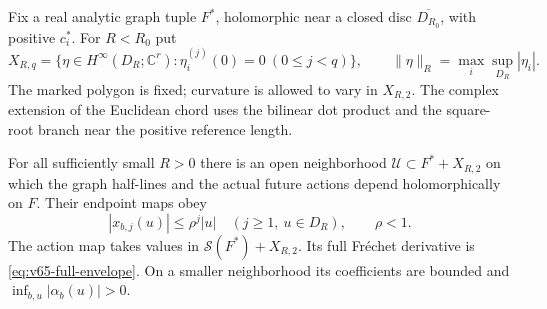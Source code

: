 Fix a real analytic graph tuple $F^*$, holomorphic near a closed disc
$\overline{D_{R_0}}$, with positive $c_i^*$.  For $R<R_0$ put
\[
 X_{R,q}=\{\eta\in H^\infty(D_R;\mathbb C^r):
                   \eta_i^{(j)}(0)=0\ (0\le j<q)\},\qquad
 \|\eta\|_R=\max_i\sup_{D_R}|\eta_i|.
\]
The marked polygon is fixed; curvature is allowed to vary in $X_{R,2}$.
The complex extension of the Euclidean chord uses the bilinear dot
product and the square-root branch near the positive reference length.

\begin{lemma}\label{lem:v65-holomorphic}
For all sufficiently small $R>0$ there is an open neighborhood
$\mathcal U\subset F^*+X_{R,2}$ on which the graph half-lines and
the actual future actions depend holomorphically on $F$.  Their endpoint
maps obey
\begin{equation}\label{eq:v65-protected-contraction}
 |x_{b,j}(u)|\le\rho^j|u|\quad(j\ge1,\ u\in D_R),\qquad \rho<1.
\end{equation}
The action map takes values in
$\mathcal S(F^*)+X_{R,2}$.  Its full Fr\'echet derivative is
\eqref{eq:v65-full-envelope}.  On a smaller neighborhood its coefficients
are bounded and $\inf_{b,u}|\alpha_b(u)|>0$.
\end{lemma}
